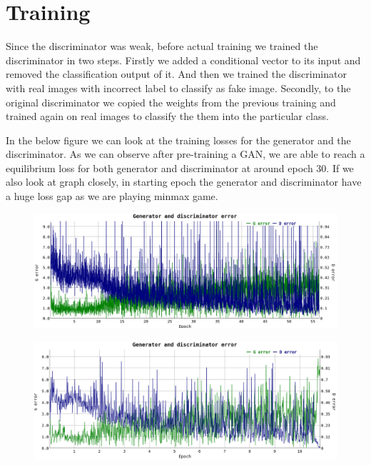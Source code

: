 \section{Training}
Since the discriminator was weak, before actual training we trained the discriminator in two steps. Firstly we added a conditional vector to its input and removed the classification output of it. And then we trained the discriminator with real images with incorrect label to classify as fake image. Secondly, to the original discriminator we copied the weights from the previous training and trained again on real images to classify the them into the particular class.  


In the below figure we can look at the training losses for the generator and the discriminator. As we can observe after pre-training a GAN, we are able to reach a equilibrium loss for both generator and discriminator at around epoch 30. If we also look at graph closely, in starting epoch the generator and discriminator have a huge loss gap as we are playing minmax game. 

\begin{figure}[H]
  \centering
    \includegraphics[scale=.4, angle=0]{Files/Training-2.png}
    \caption[Generator Discrminator Loss for Celeba dataset]{}
    \label{fig:train-celeba}
\end{figure}

\begin{figure}[H]
  \centering
    \includegraphics[scale=.4, angle=0]{Files/MNIST-GAN.png}
    \caption[Generator Discrminator Loss for MNIST dataset]{}
    \label{fig:train-mnist}
\end{figure}
